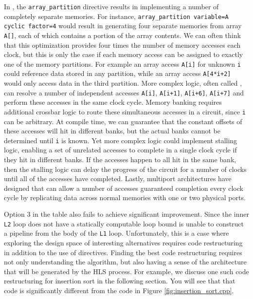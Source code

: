 \begin{aside}
In \VHLS, the \lstinline{array_partition} directive results in implementing a number of completely separate memories.  For instance, \lstinline{array_partition variable=A cyclic factor=4} would result in generating four separate memories from array \lstinline{A[]}, each of which contains a portion of the array contents.  We can often think that this optimization provides four times the number of memory accesses each clock, but this is only the case if each memory access can be assigned to exactly one of the memory partitions.   For example an array access \lstinline{A[i]} for unknown \lstinline{i} could reference data stored in any partition, while an array access \lstinline{A[4*i+2]} would only access data in the third partition.  More complex logic, often called , can resolve a number of independent accesses \lstinline{A[i]}, \lstinline{A[i+1]}, \lstinline{A[i+6]}, \lstinline{A[i+7]} and perform these accesses in the same clock cycle.  Memory banking requires additional crossbar logic to route these simultaneous accesses in a circuit, since \lstinline{i} can be arbitrary.  At compile time, we can guarantee that the constant offsets of these accesses will hit in different banks, but the actual banks cannot be determined until \lstinline{i} is known.  Yet more complex logic could implement stalling logic, enabling a set of unrelated accesses to complete in a single clock cycle if they hit in different banks.  If the accesses happen to all hit in the same bank, then the stalling logic can delay the progress of the circuit for a number of clocks until all of the accesses have completed.  Lastly, multiport architectures have designed that can allow a number of accesses guaranteed completion every clock cycle\cite{ug574,Abdelhadi2014multiport,Laforest2014multiport} by replicating data across normal memories with one or two physical ports. 
\end{aside}

Option 3 in the table also fails to achieve significant improvement.  Since the inner \lstinline{L2} loop does not have a statically computable loop bound \VHLS is unable to construct a pipeline from the body of the \lstinline{L1} loop.  Unfortunately, this is a case where exploring the design space of interesting alternatives requires code restructuring in addition to the use of directives.  Finding the best code restructuring requires not only understanding the algorithm, but also having a sense of the architecture that will be generated by the HLS process\cite{george2014hardware, matai2014enabling}. For example, we discuss one such code restructuring for insertion sort in the following section. You will see that that code is significantly different from the code in Figure \ref{fig:insertion_sort.cpp}.

